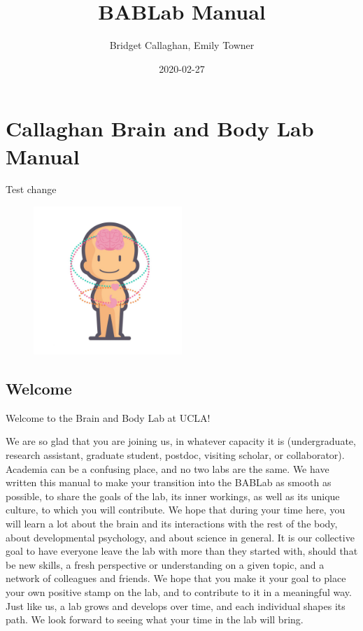 \documentclass[]{book}
\title{BABLab Manual}
\author{Bridget Callaghan, Emily Towner}
\date{2020-02-27}
\begin{document}
\maketitle

{
\setcounter{tocdepth}{1}
\tableofcontents
}
\hypertarget{callaghan-brain-and-body-lab-manual}{%
\chapter{Callaghan Brain and Body Lab Manual}\label{callaghan-brain-and-body-lab-manual}}

Test change

\begin{figure}
\centering
\includegraphics[width=0.5\textwidth,height=0.5\textheight]{images/index/Icon.jpg}
\caption{}
\end{figure}

\hypertarget{welcome}{%
\section{Welcome}\label{welcome}}

Welcome to the Brain and Body Lab at UCLA!

We are so glad that you are joining us, in whatever capacity it is (undergraduate, research assistant, graduate student, postdoc, visiting scholar, or collaborator). Academia can be a confusing place, and no two labs are the same. We have written this manual to make your transition into the BABLab as smooth as possible, to share the goals of the lab, its inner workings, as well as its unique culture, to which you will contribute. We hope that during your time here, you will learn a lot about the brain and its interactions with the rest of the body, about developmental psychology, and about science in general. It is our collective goal to have everyone leave the lab with more than they started with, should that be new skills, a fresh perspective or understanding on a given topic, and a network of colleagues and friends. We hope that you make it your goal to place your own positive stamp on the lab, and to contribute to it in a meaningful way. Just like us, a lab grows and develops over time, and each individual shapes its path. We look forward to seeing what your time in the lab will bring.
\end{document}

